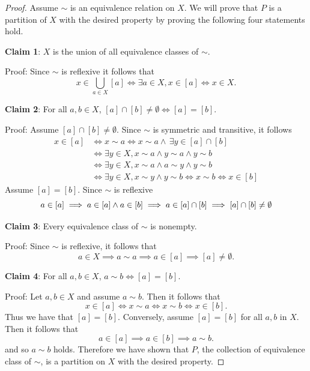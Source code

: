 \documentclass[
  letterpaper,
  10pt,
  reqno,
  twopage,
  openany]{book}
\theoremstyle{plain}
\theoremstyle{definition}
\theoremstyle{definition}
\theoremstyle{definition}
\theoremstyle{plain}
\theoremstyle{plain}
\theoremstyle{remark}
\begin{document}
\begin{proof}

Assume \(\sim\) is an equivalence relation on \(X.\) We will prove that
\(P\) is a partition of \(X\) with the desired property by proving the
following four statements hold.

\textbf{Claim 1}: \(X\) is the union of all equivalence classes of
\(\sim.\)

Proof: Since \(\sim\) is reflexive it follows that \[
x\in \bigcup_{a\in X}[a] \Leftrightarrow \exists a\in X, x\in [a] \Leftrightarrow x\in X.
\]

\textbf{Claim 2}: For all \(a,b\in X\),
\([a]\cap [b]\neq \emptyset \Leftrightarrow [a]=[b].\)

Proof: Assume \([a]\cap [b] \neq \emptyset.\) Since \(\sim\) is
symmetric and transitive, it follows \begin{align*}
x\in [a]  & \Leftrightarrow x\sim a \Leftrightarrow x\sim a \land \, \exists y\in [a] \cap [b] 
\\ &  \Leftrightarrow \exists y\in X, x\sim a \land y\sim a \land y\sim b 
\\ &  \Leftrightarrow \exists y\in X, x\sim a \land a\sim y \land y\sim b 
\\ &  \Leftrightarrow \exists y\in X, x\sim y \land y\sim b  \Leftrightarrow x\sim b \Leftrightarrow x\in [b] 
\end{align*} Assume \([a]=[b].\) Since \(\sim\) is reflexive \[
a\in [a] 
\implies  a\in [a] \land a\in [b] \\
\implies a\in [a] \cap [b] \\
\implies [a]\cap [b] \neq \emptyset
\]

\textbf{Claim 3}: Every equivalence class of \(\sim\) is nonempty.

Proof: Since \(\sim\) is reflexive, it follows that \[
a\in X \implies a\sim a \implies a\in [a] \implies [a]\neq \emptyset.
\]

\textbf{Claim 4}: For all \(a,b\in X\),
\(a\sim b \Leftrightarrow [a]=[b].\)

Proof: Let \(a,b\in X\) and assume \(a\sim b.\) Then it follows that \[
x\in [a] \Leftrightarrow x\sim a \Leftrightarrow x\sim b \Leftrightarrow x\in [b]. 
\] Thus we have that \([a]=[b].\) Conversely, assume \([a]=[b]\) for all
\(a,b\) in \(X.\) Then it follows that \[
a\in [a] \implies a\in [b] \implies a\sim b.
\] and so \(a\sim b\) holds. Therefore we have shown that \(P\), the
collection of equivalence class of \(\sim\), is a partition on \(X\)
with the desired property.


\end{proof}
\end{document}

